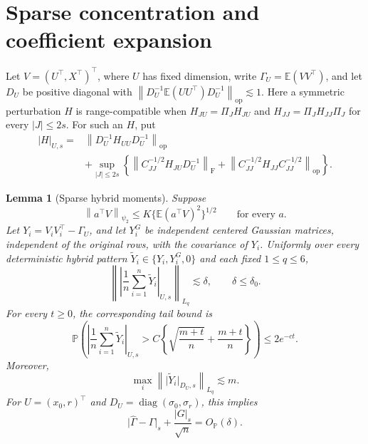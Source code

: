 \documentclass[a4paper,11pt,english]{article}
\newtheorem{lemma}[theorem]{Lemma}
\newcommand{\E}{\mathbb E}
\newcommand{\Prob}{\mathbb P}
\newcommand{\norm}[1]{\left\lVert #1\right\rVert}
\begin{document}
\section{Sparse concentration and coefficient expansion}

Let $V=(U^\top,X^\top)^\top$, where $U$ has fixed dimension, write
$\Gamma_U=\E(VV^\top)$, and let $D_U$ be positive diagonal with
$\norm{D_U^{-1}\E(UU^\top)D_U^{-1}}_{\mathrm{op}}\lesssim1$.
Here a symmetric perturbation $H$ is range-compatible when
$H_{JU}=\Pi_JH_{JU}$ and $H_{JJ}=\Pi_JH_{JJ}\Pi_J$ for every
$|J|\le2s$.  For such an $H$, put
\begin{equation}\label{eq:generic-sparse-norm}
\begin{split}
 |H|_{U,s}={}&\norm{D_U^{-1}H_{UU}D_U^{-1}}_{\mathrm{op}}\\
 &+\sup_{|J|\le2s}\left\{
 \norm{C_{JJ}^{-1/2}H_{JU}D_U^{-1}}_{\mathrm F}
 +\norm{C_{JJ}^{-1/2}H_{JJ}C_{JJ}^{-1/2}}_{\mathrm{op}}
 \right\}.
\end{split}
\end{equation}

\begin{lemma}[Sparse hybrid moments]\label{lem:sparse-hybrid-moments}
Suppose
\[
 \norm{a^\top V}_{\psi_2}\le K\{\E(a^\top V)^2\}^{1/2}
 \qquad\text{for every }a.
\]
Let $Y_i=V_iV_i^\top-\Gamma_U$, and let $Y_i^G$ be independent centered
Gaussian matrices, independent of the original rows, with the covariance
of $Y_i$.  Uniformly over every deterministic hybrid pattern
$\widetilde Y_i\in\{Y_i,Y_i^G,0\}$ and each fixed $1\le q\le6$,
\begin{equation}\label{eq:sparse-moment-concentration}
        \left\|
        \left|\frac1n\sum_{i=1}^n\widetilde Y_i\right|_{U,s}
        \right\|_{L_q}
        \lesssim\delta,
        \qquad \delta\le\delta_0.
\end{equation}
For every $t\ge0$, the corresponding tail bound is
\begin{equation}\label{eq:sparse-moment-tail}
\Prob\left(
\left|\frac1n\sum_{i=1}^n\widetilde Y_i\right|_{U,s}
>C\left\{\sqrt{\frac{m+t}{n}}+\frac{m+t}{n}\right\}
\right)
\le 2e^{-ct}.
\end{equation}
Moreover,
\begin{equation}\label{eq:one-row-moment}
        \max_i
        \left\|\lvert\widetilde Y_i\rvert_{D_U,s}\right\|_{L_q}
        \lesssim m.
\end{equation}
For $U=(x_0,r)^\top$ and
$D_U=\operatorname{diag}(\sigma_0,\sigma_r)$, this implies
\[
        \lvert\hat\Gamma-\Gamma\rvert_s
        +\frac{\lvert G\rvert_s}{\sqrt n}
        =O_{\Prob}(\delta).
\]
\end{lemma}
\end{document}
